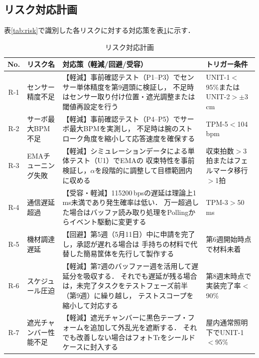 \documentclass[lualatex,book,paper=a4paper,jafontsize=11.5pt,jafontscale=1.05,oneside]{jlreq}
\begin{document}
\subsection{リスク対応計画}

表\ref{tab:risk}で識別した各リスクに対する対応策を表\ref{tab:risk-response}に示す．

\begin{table}[H]
  \centering
  \caption{リスク対応計画}
  \label{tab:risk-response}
  \small
  \begin{tabularx}{\linewidth}{clXX}
    \toprule
    No. & リスク名 & 対応策（軽減/回避/受容） & トリガー条件 \\
    \midrule
    R-1 & センサー精度不足 &
      【軽減】事前確認テスト（P1--P3）でセンサー単体精度を第9週頭に検証し，
      不足時はセンサー取り付け位置・遮光調整または閾値再設定を行う &
      UNIT-1$<$95\%またはUNIT-2$>\pm3\,$cm \\
    R-2 & サーボ最大BPM不足 &
      【軽減】事前確認テスト（P4--P5）でサーボ最大BPMを実測し，
      不足時は腕のストローク角度を縮小して応答速度を確保する &
      TPM-5$<$104\,bpm \\
    R-3 & EMAチューニング失敗 &
      【軽減】シミュレーションデータによる単体テスト（U1）でEMAの
      収束特性を事前検証し，$\alpha$を段階的に調整して目標範囲内に収める &
      収束拍数$>$3拍またはフェルマータ移行$>$1拍 \\
    R-4 & 通信遅延超過 &
      【受容・軽減】115200\,bpsの遅延は理論上1\,ms未満であり発生確率は低い．
      万一超過した場合はバッファ読み取り処理をPollingからイベント駆動に変更する &
      TPM-3$>$50\,ms \\
    R-5 & 機材調達遅延 &
      【回避】第5週（5月11日）中に申請を完了し，承認が遅れる場合は
      手持ちの材料で代替した簡易筐体を先行して製作する &
      第6週開始時点で材料未着 \\
    R-6 & スケジュール圧迫 &
      【軽減】第7週のバッファー週を活用して遅延分を吸収する．
      それでも遅延が残る場合は，未完了タスクをテストフェーズ前半（第9週）に繰り越し，
      テストスコープを縮小して対応する &
      第8週末時点で実装完了率$<$90\% \\
    R-7 & 遮光チャンバー性能不足 &
      【軽減】遮光チャンバーに黒色テープ・フォームを追加して外乱光を遮断する．
      それでも改善しない場合はフォトTrをシールドケースに封入する &
      屋内通常照明下でUNIT-1$<$95\% \\
    \bottomrule
  \end{tabularx}
\end{table}
\end{document}
